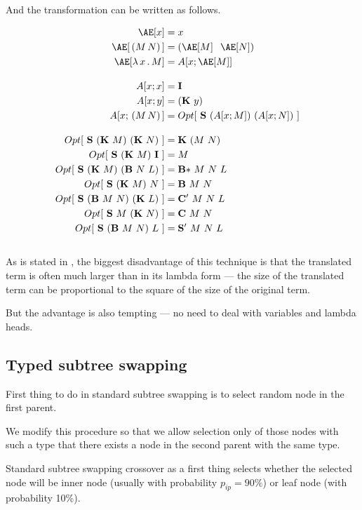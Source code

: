 \documentclass[12pt,a4paper]{report}
\begin{document}
\newpage
And the transformation can be written as follows.

\begin{align*}
\Ae[x]           &= x &\\
\Ae[\,(M\,N)\,]  &= (\Ae[M]\;\;\Ae[N]) &\\
\Ae[\lam{x}{M}]  &= A[ x ; \Ae[M] ] &
\\[1em]
A[x;x]           &= \Icomb &\\
A[x;y]           &= (\Kcomb~y)\\
A[x;\,(M\,N)\,]  &= Opt[~\Scomb~(A[x;M])~(A[x;N])~]
\\[1em]
Opt[~\Scomb~(\Kcomb~M)~(\Kcomb~N)~]   &= \Kcomb~(M~N)\\
Opt[~\Scomb~(\Kcomb~M)~\Icomb~]       &= M\\
Opt[~\Scomb~(\Kcomb~M)~(\Bcomb~N~L)~] &= \BBcomb~M~N~L\\
Opt[~\Scomb~(\Kcomb~M)~N~]            &= \Bcomb~M~N\\
Opt[~\Scomb~(\Bcomb~M~N)~(\Kcomb~L)~] &= \CCcomb~M~N~L\\
Opt[~\Scomb~M~(\Kcomb~N)~]            &= \Ccomb~M~N\\
Opt[~\Scomb~(\Bcomb~M~N)~L~]          &= \SScomb~M~N~L
\end{align*}
\\

As is stated in \cite{jones87},
the biggest disadvantage of this technique is that the translated
term is often much larger than in its lambda form --- the size of
the translated term can be proportional to the
square of the size of the original term. 

But the advantage is also tempting --- no need to deal with variables
and lambda heads.


\subsection{Typed subtree swapping}
\label{typed-swapping}

First thing to do in standard subtree swapping is to select random node
in the first parent. 

We modify this procedure so that we allow
selection only of those nodes with such a type that there exists  
a node in the second parent with the same type.

Standard subtree swapping crossover as a first thing selects 
whether the selected node will be inner node (usually with probability 
$p_{ip} = 90\%$) or leaf node (with probability 10\%).
\end{document}
